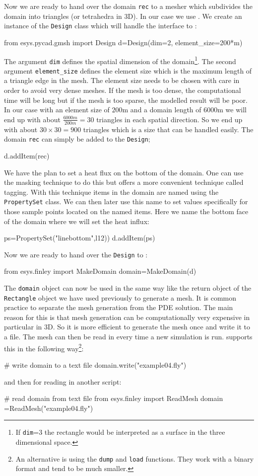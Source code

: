 Now we are ready to hand over the domain \verb|rec| to a mesher which
subdivides the domain into triangles (or tetrahedra in 3D). In our case we use
\gmsh. We create an instance of the \verb|Design| class which will handle the
interface to \gmsh: 
\begin{python}
from esys.pycad.gmsh import Design 
d=Design(dim=2, element_size=200*m)
\end{python}
The argument \verb|dim| defines the spatial dimension of the domain\footnote{If
\texttt{dim}=3 the rectangle would be interpreted as a surface in the three
dimensional space.}. The second argument \verb|element_size| defines the element
size which is the maximum length of a triangle edge in the mesh. The element
size needs to be chosen with care in order to avoid very dense meshes. If the
mesh is too dense, the computational time will be long but if the mesh is too
sparse, the modelled result will be poor. In our case with an element size of
$200$m and a domain length of $6000$m we will end up with about $\frac{6000m}{200m}=30$
triangles in each spatial direction. So we end up with about $30 \times 30 =
900$ triangles which is a size that can be handled easily.
The domain \verb|rec| can simply be added to the \verb|Design|;
\begin{python}
d.addItem(rec)
\end{python}
We have the plan to set a heat flux on the bottom of the domain. One can use
the masking technique to do this but \pycad offers a more convenient technique
called tagging. With this technique items in the domain are named using the
\verb|PropertySet| class. We can then later use this name to set values
specifically for those sample points located on the named items. Here we name
the bottom face of the domain where we will set the heat influx:
\begin{python}
ps=PropertySet("linebottom",l12))
d.addItem(ps)
\end{python}
Now we are ready to hand over the \verb|Design| to \FINLEY:
\begin{python}
from esys.finley import MakeDomain
domain=MakeDomain(d)
\end{python}
The \verb|domain| object can now be used in the same way like the return object
of the \verb|Rectangle| object we have used previously to generate a mesh. It
is common practice to separate the mesh generation from the PDE solution.
The main reason for this is that mesh generation can be computationally very
expensive in particular in 3D. So it is more efficient to generate the mesh
once and write it to a file. The mesh can then be read in every time a new
simulation is run. \FINLEY supports this in the following 
way\footnote{An alternative is using the \texttt{dump} and \texttt{load}
functions. They work with a binary format and tend to be much smaller.}:
\begin{python}
# write domain to a text file
domain.write("example04.fly")
\end{python}
and then for reading in another script:
\begin{python}
# read domain from text file
from esys.finley import ReadMesh
domain =ReadMesh("example04.fly")
\end{python}


